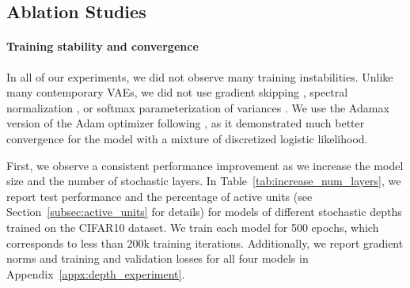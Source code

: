 



\subsection{Ablation Studies}\label{sect:ablation}


\paragraph{Training stability and convergence}


In all of our experiments, we did not observe many training instabilities. 
Unlike many contemporary VAEs, we did not use gradient skipping \citep{Child2020-ze}, spectral normalization \citep{vahdat2020nvae}, or softmax parameterization of variances \citep{hazami2022efficientvdvae}. 
We use the Adamax version of the Adam optimizer \citep{kingma2015adam} following \citet{hazami2022efficientvdvae}, as it demonstrated much better convergence for the model with a mixture of discretized logistic likelihood. 

First, we observe a consistent performance improvement as we increase the model size and the number of stochastic layers. 
In Table~\ref{tab:increase_num_layers}, we report test performance and the percentage of active units (see Section~\ref{subsec:active_units} for details) for models of different stochastic depths trained on the CIFAR10 dataset. 
We train each model for 500 epochs, which corresponds to less than 200k training iterations. 
Additionally, we report gradient norms and training and validation losses for all four models in Appendix~\ref{appx:depth_experiment}. 



